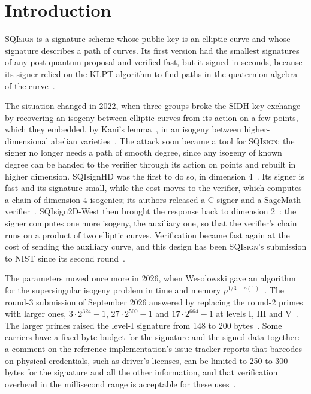 \documentclass[version=preprint]{iacrcc}
\newcommand{\SQIsign}{SQI{\textsc{sign}}}
\begin{document}
    \section{Introduction}

    {\SQIsign} is a signature scheme whose public key is an elliptic curve and
    whose signature describes a path of curves. Its first version had the
    smallest signatures of any post-quantum proposal and verified fast, but it
    signed in seconds, because its signer relied on the KLPT algorithm to find
    paths in the quaternion algebra of the curve~\cite{FKL+20}.

    The situation changed in 2022, when three groups broke the SIDH key
    exchange by recovering an isogeny between elliptic curves from its action
    on a few points, which they embedded, by Kani's lemma~\cite{Kan97}, in an
    isogeny between higher-dimensional abelian
    varieties~\cite{CD23,MMP+23,Rob23}. The attack soon became a tool for
    {\SQIsign}: the signer no longer needs a path of smooth degree, since any
    isogeny of known degree can be handed to the verifier through its action
    on points and rebuilt in higher dimension. SQIsignHD was the first to do
    so, in dimension 4~\cite{DLRW24}. Its signer is fast and its signature
    small, while the cost moves to the verifier, which computes a chain of
    dimension-4 isogenies; its authors released a C signer and a SageMath
    verifier~\cite{DLRW25}. SQIsign2D-West then brought the response back to
    dimension 2~\cite{BDF+24}: the signer computes one more isogeny, the
    auxiliary one, so that the verifier's chain runs on a product of two
    elliptic curves. Verification became fast again at the cost of sending the
    auxiliary curve, and this design has been {\SQIsign}'s submission to NIST
    since its second round~\cite{AAA+25,AAA+26}.

    The parameters moved once more in 2026, when Wesolowski gave an algorithm
    for the supersingular isogeny problem in time and memory
    $p^{1/3+o(1)}$~\cite{Wes26}. The round-3 submission of September 2026
    answered by replacing the round-2 primes with larger ones, $3 \cdot 2^{324}
    - 1$, $27 \cdot 2^{500} - 1$ and $17 \cdot 2^{664} - 1$ at levels I, III
    and V~\cite{AAA+26}. The larger primes raised the level-I signature from
    148 to 200 bytes~\cite{AAA+25,AAA+26}. Some carriers have a fixed byte
    budget for the signature and the signed data together: a comment on the
    reference implementation's issue tracker reports that barcodes on
    physical credentials, such as driver's licenses, can be limited to 250
    to 300 bytes for the signature and all the other information, and that
    verification overhead in the millisecond range is acceptable for these
    uses~\cite{SQI26i19}.
\end{document}

